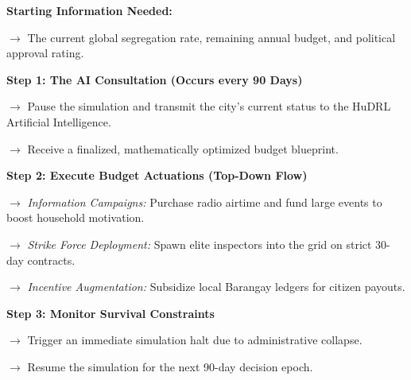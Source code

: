 \vspace{0.5cm} 
\begin{algorithm}[H]
\caption{The Mayor Agent's Quarterly Intervention Cycle}
\label{alg:mayor_decision_english}
\begin{algorithmic}[1]
\State \textbf{Starting Information Needed:} 
\State \parbox[t]{0.9\linewidth}{$\rightarrow$ The current global segregation rate, remaining annual budget, and political approval rating.\strut}
\Statex
\State \textbf{Step 1: The AI Consultation (Occurs every 90 Days)}
\State \parbox[t]{0.9\linewidth}{$\rightarrow$ Pause the simulation and transmit the city's current status to the HuDRL Artificial Intelligence.\strut}
\State \parbox[t]{0.9\linewidth}{$\rightarrow$ Receive a finalized, mathematically optimized budget blueprint.\strut}
\Statex
\State \textbf{Step 2: Execute Budget Actuations (Top-Down Flow)}
    \State \parbox[t]{0.88\linewidth}{$\rightarrow$ \textit{Information Campaigns:} Purchase radio airtime and fund large events to boost household motivation.\strut}
    \State \parbox[t]{0.88\linewidth}{$\rightarrow$ \textit{Strike Force Deployment:} Spawn elite inspectors into the grid on strict 30-day contracts.\strut}
    \State \parbox[t]{0.88\linewidth}{$\rightarrow$ \textit{Incentive Augmentation:} Subsidize local Barangay ledgers for citizen payouts.\strut}
\EndFor
\Statex
\State \textbf{Step 3: Monitor Survival Constraints}
    \State \parbox[t]{0.88\linewidth}{$\rightarrow$ Trigger an immediate simulation halt due to administrative collapse.\strut}
\Else
    \State \parbox[t]{0.88\linewidth}{$\rightarrow$ Resume the simulation for the next 90-day decision epoch.\strut}
\EndIf
\end{algorithmic}
\end{algorithm}
